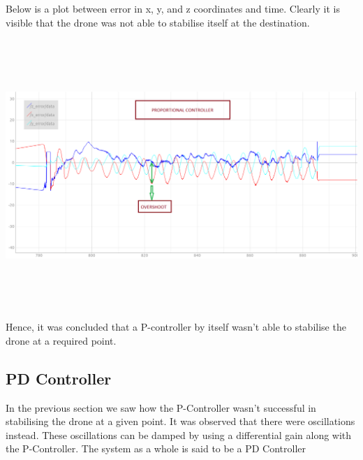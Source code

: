 \documentclass[a4paper,12pt,oneside]{book}
\begin{document}
Below is a plot between error in x, y, and z coordinates and time. Clearly it is visible that the drone was not able to stabilise itself at the destination.\\ \\
\includegraphics[width = 15cm , height= 10cm]{only-P(all).png}

Hence, it was concluded that a P-controller by itself wasn't able to stabilise the drone at a required point. \\

\subsection{PD Controller}
In the previous section we saw how the P-Controller wasn't successful in stabilising the drone at a given point. It was observed that there were oscillations instead. These oscillations can be damped by using a differential gain  along with the P-Controller. The system as a whole is said to be a PD Controller 
\end{document}
